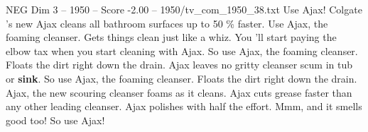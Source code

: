 \begin{textsample}{NEG Dim 3 – 1950 – Score -2.00 – 1950/tv\_com\_1950\_38.txt}  \label{ex:f3_neg_088}
Use Ajax!
Colgate 's new Ajax cleans all bathroom surfaces up to 50 \% faster.
Use Ajax, the foaming cleanser.
Gets things clean just like a whiz.
You 'll start paying the elbow tax when you start cleaning with Ajax.
So use Ajax, the foaming cleanser.
Floats the dirt right down the drain.
Ajax leaves no gritty cleanser scum in tub or \textbf{sink}.
So use Ajax, the foaming cleanser.
Floats the dirt right down the drain.
Ajax, the new scouring cleanser foams as it cleans.
Ajax cuts grease faster than any other leading cleanser.
Ajax polishes with half the effort.
Mmm, and it smells good too!
So use Ajax!

\end{textsample}
